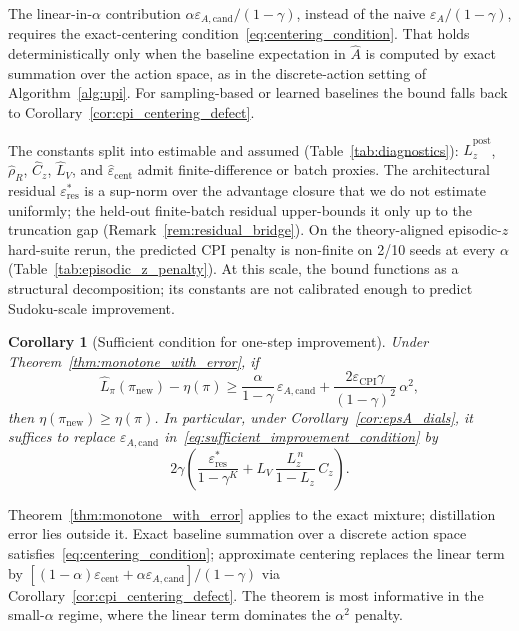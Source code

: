 \documentclass{article}
\theoremstyle{plain}
\newtheorem{corollary}[theorem]{Corollary}
\theoremstyle{definition}
\theoremstyle{remark}
\begin{document}
The linear-in-$\alpha$ contribution $\alpha\varepsilon_{A,\mathrm{cand}}/(1-\gamma)$, instead of the naive $\varepsilon_A/(1-\gamma)$, requires the exact-centering condition~\eqref{eq:centering_condition}. That holds deterministically only when the baseline expectation in $\widehat A$ is computed by exact summation over the action space, as in the discrete-action setting of Algorithm~\ref{alg:upi}. For sampling-based or learned baselines the bound falls back to Corollary~\ref{cor:cpi_centering_defect}.

The constants split into estimable and assumed (Table~\ref{tab:diagnostics}): $\hat L_z^{\mathrm{post}}$, $\hat\rho_R$, $\hat C_z$, $\hat L_V$, and $\hat\varepsilon_{\mathrm{cent}}$ admit finite-difference or batch proxies. The architectural residual $\varepsilon_{\mathrm{res}}^*$ is a sup-norm over the advantage closure that we do not estimate uniformly; the held-out finite-batch residual upper-bounds it only up to the truncation gap (Remark~\ref{rem:residual_bridge}). On the theory-aligned episodic-$z$ hard-suite rerun, the predicted CPI penalty is non-finite on 2/10 seeds at every $\alpha$ (Table~\ref{tab:episodic_z_penalty}). At this scale, the bound functions as a structural decomposition; its constants are not calibrated enough to predict Sudoku-scale improvement.

\begin{corollary}[Sufficient condition for one-step improvement]
\label{cor:one_step_improvement_condition}
Under Theorem~\ref{thm:monotone_with_error}, if
\begin{equation}
\widehat{L}_\pi(\pi_{\mathrm{new}})-\eta(\pi)
\ge
\frac{\alpha}{1-\gamma}\,\varepsilon_{A,\mathrm{cand}}
+
\frac{2\varepsilon_{\mathrm{CPI}}\gamma}{(1-\gamma)^2}\,\alpha^2,
\label{eq:sufficient_improvement_condition}
\end{equation}
then $\eta(\pi_{\mathrm{new}})\ge \eta(\pi)$.
In particular, under Corollary~\ref{cor:epsA_dials}, it suffices to replace
$\varepsilon_{A,\mathrm{cand}}$ in~\eqref{eq:sufficient_improvement_condition}
by
\[
2\gamma\left(
\frac{\varepsilon_{\mathrm{res}}^*}{1-\gamma^K}
+
L_V\,\frac{L_z^{\,n}}{1-L_z}\,C_z
\right).
\]
\end{corollary}

Theorem~\ref{thm:monotone_with_error} applies to the exact mixture; distillation error lies outside it. Exact baseline summation over a discrete action space satisfies~\eqref{eq:centering_condition}; approximate centering replaces the linear term by $[(1-\alpha)\varepsilon_{\mathrm{cent}}+\alpha\varepsilon_{A,\mathrm{cand}}]/(1-\gamma)$ via Corollary~\ref{cor:cpi_centering_defect}. The theorem is most informative in the small-$\alpha$ regime, where the linear term dominates the $\alpha^2$ penalty.
\end{document}
